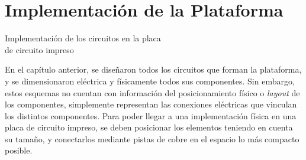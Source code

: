 \section{Implementación de la Plataforma} \label{implementacion}
\thispagestyle{plain}

\vspace{0.5cm}

\Large\scshape
\begin{center}
    {\Medium Implementación de los circuitos en la placa\\ de circuito impreso}
\end{center}
\normalfont

\divider

En el capítulo anterior, se diseñaron todos los circuitos que forman la plataforma, y se dimensionaron eléctrica y físicamente todos sus componentes. Sin embargo, estos esquemas no cuentan con información del posicionamiento físico o \textit{layout} de los componentes, simplemente representan las conexiones eléctricas que vinculan los distintos componentes. Para poder llegar a una implementación física en una placa de circuito impreso, se deben posicionar los elementos teniendo en cuenta su tamaño, y conectarlos mediante pistas de cobre en el espacio lo más compacto posible.\\

